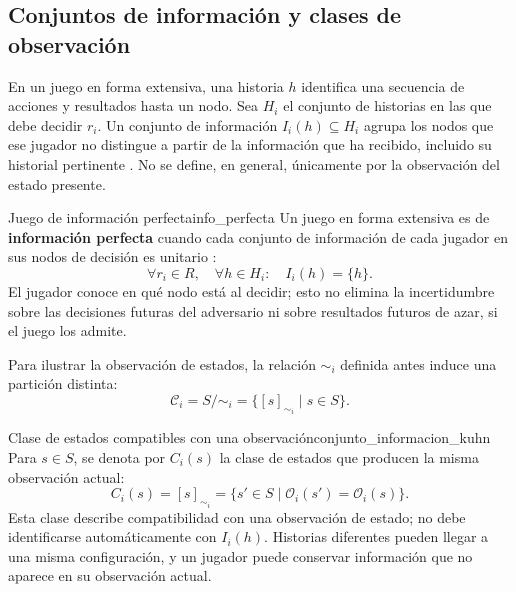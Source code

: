\subsection{Conjuntos de información y clases de observación}

En un juego en forma extensiva, una historia $h$ identifica una secuencia de acciones y resultados hasta un nodo. Sea $H_i$ el conjunto de historias en las que debe decidir $r_i$. Un conjunto de información $I_i(h)\subseteq H_i$ agrupa los nodos que ese jugador no distingue a partir de la información que ha recibido, incluido su historial pertinente \cite{Kuhn1953, OsborneRubinstein1994}. No se define, en general, únicamente por la observación del estado presente.

\begin{definicion}{Juego de información perfecta}{info_perfecta}
Un juego en forma extensiva es de \textbf{información perfecta} cuando cada conjunto de información de cada jugador en sus nodos de decisión es unitario \cite{Kuhn1953, OsborneRubinstein1994}:
\begin{equation}
    \forall r_i\in R,\quad \forall h\in H_i:\quad I_i(h)=\{h\}.
    \label{eq:informacion-perfecta}
\end{equation}
El jugador conoce en qué nodo está al decidir; esto no elimina la incertidumbre sobre las decisiones futuras del adversario ni sobre resultados futuros de azar, si el juego los admite.
\end{definicion}

Para ilustrar la observación de estados, la relación $\sim_i$ definida antes induce una partición distinta:
\begin{equation}
    \mathcal C_i=S/\sim_i=\{[s]_{\sim_i}\mid s\in S\}.
    \label{eq:particion-informacion}
\end{equation}

\begin{definicion}{Clase de estados compatibles con una observación}{conjunto_informacion_kuhn}
Para $s\in S$, se denota por $C_i(s)$ la clase de estados que producen la misma observación actual:
\begin{equation}
    C_i(s)=[s]_{\sim_i}=\{s'\in S\mid\mathcal O_i(s')=\mathcal O_i(s)\}.
    \label{eq:conjunto-informacion}
\end{equation}
Esta clase describe compatibilidad con una observación de estado; no debe identificarse automáticamente con $I_i(h)$. Historias diferentes pueden llegar a una misma configuración, y un jugador puede conservar información que no aparece en su observación actual.
\end{definicion}

